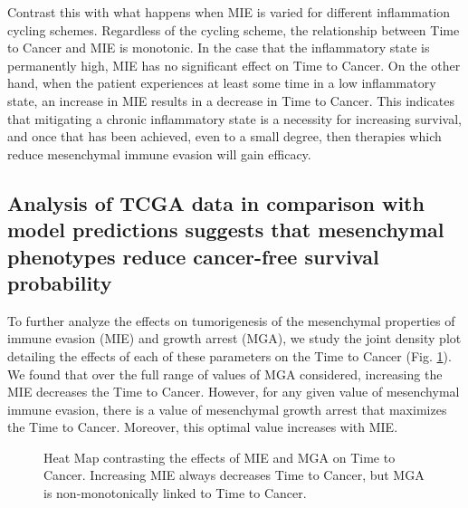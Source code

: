 \documentclass[11pt, a4paper, preprint]{article}
\begin{document}
Contrast this with what happens when MIE is varied for different inflammation cycling schemes.
Regardless of the cycling scheme, the relationship between Time to Cancer and MIE is monotonic.
In the case that the inflammatory state is permanently high, MIE has no significant effect on Time to Cancer.
On the other hand, when the patient experiences at least some time in a low inflammatory state, an increase in MIE results in a decrease in Time to Cancer.
This indicates that mitigating a chronic inflammatory state is a necessity for increasing survival, and once that has been achieved, even to a small degree, then therapies which reduce mesenchymal immune evasion will gain efficacy.


\subsection{Analysis of TCGA data in comparison with model predictions suggests that mesenchymal phenotypes reduce cancer-free survival probability}\label{tcga}

To further analyze the effects on tumorigenesis of the mesenchymal properties of immune evasion (MIE) and growth arrest (MGA), we study the joint density plot detailing the effects of each of these parameters on the Time to Cancer (Fig. \ref{fig:MIEvsMGA}). We found that over the full range of values of MGA considered, increasing the MIE decreases the Time to Cancer. However, for any given value of mesenchymal immune evasion, there is a value of mesenchymal growth arrest that maximizes the Time to Cancer. Moreover, this optimal value increases with MIE. 

\begin{figure}[H]
\center
{}
\caption{Heat Map contrasting the effects of MIE and MGA on Time to Cancer. Increasing MIE always decreases Time to Cancer, but MGA is non-monotonically linked to Time to Cancer.}
\label{fig:MIEvsMGA}
\end{figure}
\end{document}
